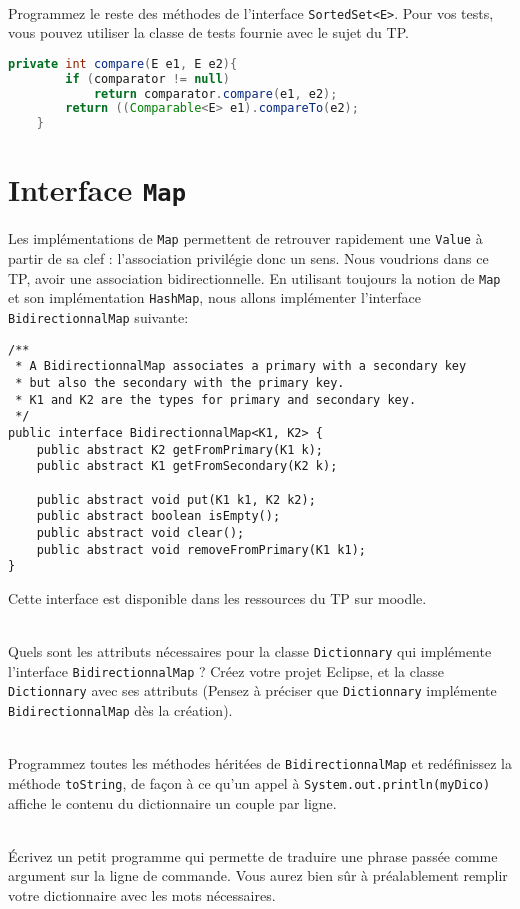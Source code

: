 \documentclass[iutinfo,a4paper,10pt]{ustl-tdtp}
\begin{document}
~\\ \question Programmez le reste des méthodes de l'interface \texttt{SortedSet<E>}. Pour vos tests, vous pouvez utiliser la classe de tests fournie avec le sujet du TP.

\begin{correction}
{\color{red}
\begin{lstlisting}[language=Java]
    private int compare(E e1, E e2){
        if (comparator != null)
            return comparator.compare(e1, e2);
        return ((Comparable<E> e1).compareTo(e2);
    }
\end{lstlisting}
}

\end{correction}

\section{Interface \texttt{Map}}
Les implémentations de \texttt{Map} permettent de retrouver rapidement
une \texttt{Value} à partir de sa clef : l'association privilégie donc
un sens. Nous voudrions dans ce TP, avoir une association
bidirectionnelle. En utilisant toujours la notion de \texttt{Map} et
son implémentation \texttt{HashMap}, nous
allons implémenter l'interface \texttt{BidirectionnalMap} suivante:

\begin{verbatim}
/**
 * A BidirectionnalMap associates a primary with a secondary key  
 * but also the secondary with the primary key.
 * K1 and K2 are the types for primary and secondary key.
 */
public interface BidirectionnalMap<K1, K2> {
    public abstract K2 getFromPrimary(K1 k);
    public abstract K1 getFromSecondary(K2 k);

    public abstract void put(K1 k1, K2 k2);
    public abstract boolean isEmpty();
    public abstract void clear();
    public abstract void removeFromPrimary(K1 k1);
}
\end{verbatim}

Cette interface est disponible dans les ressources du TP sur moodle.

~\\ \question Quels sont les attributs nécessaires pour la
classe \texttt{Dictionnary} qui implémente l'interface
\texttt{BidirectionnalMap} ? Créez votre projet Eclipse, et la classe
\texttt{Dictionnary} avec ses attributs (Pensez à préciser que
\texttt{Dictionnary} implémente \texttt{BidirectionnalMap} dès la
création).

~\\ \question Programmez toutes les méthodes héritées de
\texttt{BidirectionnalMap} et redéfinissez la méthode
\texttt{toString}, de façon à ce qu'un appel à
\texttt{System.out.println(myDico)} affiche le contenu du dictionnaire
un couple par ligne.

~\\ \question Écrivez un petit programme qui permette de
traduire une phrase passée comme argument sur la ligne de commande. Vous aurez bien sûr à préalablement remplir votre dictionnaire avec les mots nécessaires.
\end{document}
